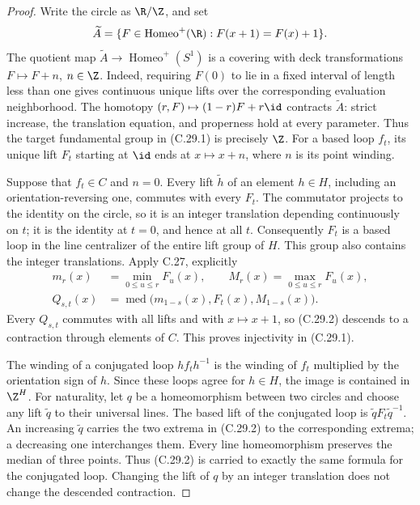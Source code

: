 \begin{proof}
Write the circle as $\R/\Z$, and set
\[
 \widetilde A=\{F\in\operatorname{Homeo}^+(\R):
                        F(x+1)=F(x)+1\}.
\]
The quotient map $\widetilde A\to\operatorname{Homeo}^+(S^1)$ is a
covering with deck transformations $F\mapsto F+n$, $n\in\Z$.
Indeed, requiring $F(0)$ to lie in a fixed interval of length less
than one gives continuous unique lifts over the corresponding
evaluation neighborhood. The homotopy
$(r,F)\mapsto(1-r)F+r\id$ contracts $\widetilde A$: strict
increase, the translation equation, and properness hold at every
parameter. Thus the target fundamental group in (C.29.1) is precisely
$\Z$. For a based loop $f_t$, its unique lift $F_t$ starting at
$\id$ ends at $x\mapsto x+n$, where $n$ is its point winding.

Suppose that $f_t\in C$ and $n=0$. Every lift $\widetilde h$ of an
element $h\in H$, including an orientation-reversing one, commutes
with every $F_t$. The commutator projects to the identity on the
circle, so it is an integer translation depending continuously on
$t$; it is the identity at $t=0$, and hence at all $t$.
Consequently $F_t$ is a based loop in the line centralizer of the
entire lift group of $H$. This group also contains the integer
translations. Apply C.27, explicitly
\[
 \begin{split}
 m_r(x)&=\min_{0\leq u\leq r}F_u(x),\qquad
 M_r(x)=\max_{0\leq u\leq r}F_u(x),\\
 Q_{s,t}(x)&=\operatorname{med}
       \bigl(m_{1-s}(x),F_t(x),M_{1-s}(x)\bigr).
 \end{split}                                                   \tag{C.29.2}
\]
Every $Q_{s,t}$ commutes with all lifts and with $x\mapsto x+1$,
so (C.29.2) descends to a contraction through elements of $C$.
This proves injectivity in (C.29.1).

The winding of a conjugated loop $h f_t h^{-1}$ is the winding of
$f_t$ multiplied by the orientation sign of $h$. Since these loops
agree for $h\in H$, the image is contained in $\Z^H$. For naturality,
let $q$ be a homeomorphism between two circles and choose any lift
$\widetilde q$ to their universal lines. The based lift of the
conjugated loop is $\widetilde q F_t\widetilde q^{-1}$.
An increasing $\widetilde q$ carries the two extrema in (C.29.2)
to the corresponding extrema; a decreasing one interchanges them.
Every line homeomorphism preserves the median of three points.
Thus (C.29.2) is carried to exactly the same formula for the
conjugated loop. Changing the lift of $q$ by an integer translation
does not change the descended contraction.


\end{proof}
